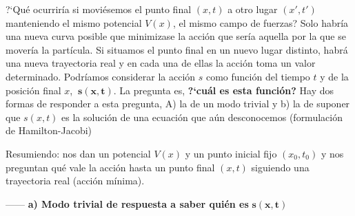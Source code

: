 ?`Qué ocurriría si moviésemos el punto final $(x,t)$ a otro lugar $(x',t')$ manteniendo el mismo potencial $V(x)$, el mismo campo de fuerzas? Solo habría una nueva curva posible que minimizase la acción que sería aquella por la que se movería la partícula. Si situamos el punto final en un nuevo lugar distinto, habrá una nueva trayectoria real y en cada una de ellas la acción toma un valor determinado. Podríamos considerar la acción $s$ como función del tiempo $t$ y de la posición final $x$, $\ \boldsymbol{ s(x,t) }$. La pregunta es, \textbf{?`cuál es esta función?} Hay dos formas de responder a esta pregunta, A) la de un modo trivial y b) la de suponer que $s(x,t)$ es la solución de una ecuación que aún desconocemos (formulación de Hamilton-Jacobi)

Resumiendo: nos dan un potencial $V(x)$ y un punto inicial fijo $(x_0,t_0)$ y nos preguntan qué vale la acción hasta un punto final $(x,t)$ siguiendo una trayectoria real (acción mínima).

------ \textbf{a) Modo trivial de respuesta a saber quién es} $\boldsymbol{s(x,t)} $


